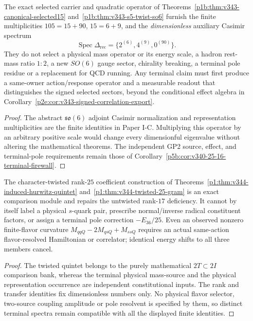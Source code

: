\documentclass[12pt,a4paper]{article}
\begin{document}
\begin{corollary}
\label{p5b:cor:v343-reciprocal-casimir-no-mass}
The exact selected carrier and quadratic operator of
Theorems~\ref{p1b:thm:v343-canonical-selected15}
and~\ref{p1b:thm:v343-s5-twist-so6} furnish the finite
multiplicities $105=15+90$, $15=6+9$, and the
\emph{dimensionless} auxiliary Casimir spectrum
\[
 \operatorname{Spec}\Delta_{\mathrm{rec}}
   =\{2^{(6)},4^{(9)},0^{(90)}\}.
\]
They do not select a physical mass operator or its energy scale,
a hadron rest-mass ratio $1:2$, a new $SO(6)$ gauge sector,
chirality breaking, a terminal pole residue or a replacement
for QCD running.  Any terminal claim must first produce a
same-owner action/response operator and a measurable readout
that distinguishes the signed selected sectors, beyond the
conditional effect algebra in
Corollary~\ref{p2e:cor:v343-signed-correlation-export}.
\end{corollary}
\begin{proof}
The abstract $\mathfrak{so}(6)$ adjoint Casimir normalization
and representation multiplicities are the finite identities
in Paper I-C.  Multiplying this operator by an arbitrary
positive scale would change every dimensionful eigenvalue
without altering the mathematical theorems.  The independent
GP2 source, effect, and terminal-pole requirements remain those
of Corollary~\ref{p5b:cor:v340-25-16-terminal-firewall}.
\end{proof}


\begin{corollary}
\label{p5b:cor:v344-twisted-quintet-no-mass}
The character-twisted rank-$25$ coefficient construction of
Theorems~\ref{p1:thm:v344-induced-hurwitz-quintet}
and~\ref{p1:thm:v344-twisted-25-gram} is an exact comparison
module and repairs the untwisted rank-$17$ deficiency.
It cannot by itself label a physical $s$-quark pair, prescribe
normal/inverse radical constituent factors, or assign a terminal
pole correction $-E_{36}/25$.  Even an observed nonzero
finite-flavor curvature
$M_{qqQ}-2M_{qsQ}+M_{ssQ}$ requires an
actual same-action flavor-resolved Hamiltonian or correlator;
identical energy shifts to all three members cancel.
\end{corollary}
\begin{proof}
The twisted quintet belongs to the purely mathematical
$2T\subset2I$ comparison bank, whereas the terminal physical
mass-source and the physical representation occurrence are
independent constitutional inputs.  The rank and transfer
identities fix dimensionless numbers only.  No physical flavor
selector, two-source coupling amplitude or pole resolvent is
specified by them, so distinct terminal spectra remain compatible
with all the displayed finite identities.
\end{proof}
\end{document}
